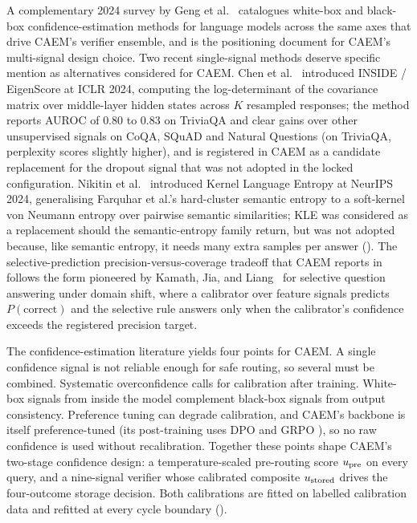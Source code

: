 A complementary 2024 survey by Geng et al.~\cite{geng2024survey} catalogues white-box and black-box confidence-estimation methods for language models across the same axes that drive CAEM's verifier ensemble, and is the positioning document for CAEM's multi-signal design choice. Two recent single-signal methods deserve specific mention as alternatives considered for CAEM. Chen et al.~\cite{chen2024inside} introduced INSIDE / EigenScore at ICLR 2024, computing the log-determinant of the covariance matrix over middle-layer hidden states across $K$ resampled responses; the method reports AUROC of $0.80$ to $0.83$ on TriviaQA and clear gains over other unsupervised signals on CoQA, SQuAD and Natural Questions (on TriviaQA, perplexity scores slightly higher), and is registered in CAEM as a candidate replacement for the dropout signal that was not adopted in the locked configuration. Nikitin et al.~\cite{nikitin2024kle} introduced Kernel Language Entropy at NeurIPS 2024, generalising Farquhar et al.'s hard-cluster semantic entropy to a soft-kernel von Neumann entropy over pairwise semantic similarities; KLE was considered as a replacement should the semantic-entropy family return, but was not adopted because, like semantic entropy, it needs many extra samples per answer (). The selective-prediction precision-versus-coverage tradeoff that CAEM reports in  follows the form pioneered by Kamath, Jia, and Liang~\cite{kamath2020selective} for selective question answering under domain shift, where a calibrator over feature signals predicts $P(\text{correct})$ and the selective rule answers only when the calibrator's confidence exceeds the registered precision target.

The confidence-estimation literature yields four points for CAEM. A single confidence signal is not reliable enough for safe routing, so several must be combined. Systematic overconfidence calls for calibration after training. White-box signals from inside the model complement black-box signals from output consistency. Preference tuning can degrade calibration, and CAEM's backbone is itself preference-tuned (its post-training uses DPO and GRPO \cite{qwen25}), so no raw confidence is used without recalibration. Together these points shape CAEM's two-stage confidence design: a temperature-scaled pre-routing score $u_{\text{pre}}$ on every query, and a nine-signal verifier whose calibrated composite $u_{\text{stored}}$ drives the four-outcome storage decision. Both calibrations are fitted on labelled calibration data and refitted at every cycle boundary ().


